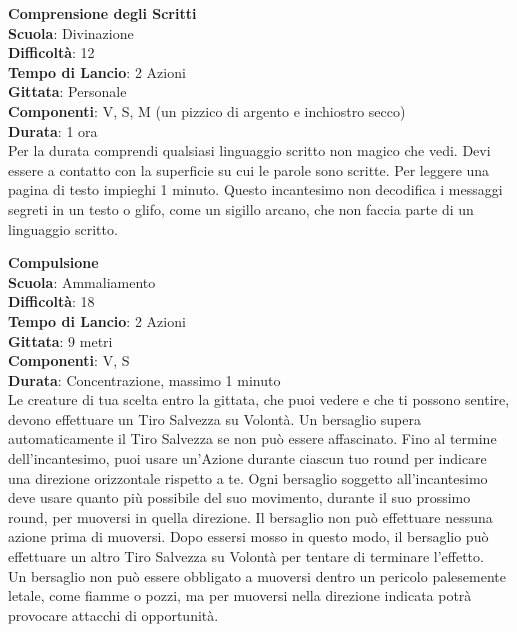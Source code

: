 \begin{multicols}{2}
\medskip\textbf{Comprensione degli Scritti}\\
\textbf{Scuola}: Divinazione\\
\textbf{Difficoltà}: 12\\
\textbf{Tempo di Lancio}: 2 Azioni\\
\textbf{Gittata}: Personale\\
\textbf{Componenti}: V, S, M (un pizzico di argento e inchiostro secco)\\
\textbf{Durata}: 1 ora\\
Per la durata comprendi qualsiasi linguaggio scritto non magico che vedi. Devi essere a contatto con la superficie su cui le parole sono scritte. Per leggere una pagina di testo impieghi 1 minuto. Questo incantesimo non decodifica i messaggi segreti in un testo o glifo, come un sigillo arcano, che non faccia parte di un linguaggio scritto.

\medskip\textbf{Compulsione}\\
\textbf{Scuola}: Ammaliamento\\
\textbf{Difficoltà}: 18\\
\textbf{Tempo di Lancio}: 2 Azioni\\
\textbf{Gittata}: 9 metri\\
\textbf{Componenti}: V, S\\
\textbf{Durata}: Concentrazione, massimo 1 minuto\\
Le creature di tua scelta entro la gittata, che puoi vedere e che ti possono sentire, devono effettuare un Tiro Salvezza su Volontà. Un bersaglio supera automaticamente il Tiro Salvezza se non può essere affascinato. Fino al termine dell'incantesimo, puoi usare un'Azione durante ciascun tuo round per indicare una direzione orizzontale rispetto a te. Ogni bersaglio soggetto all'incantesimo deve usare quanto più possibile del suo movimento, durante il suo prossimo round, per muoversi in quella direzione. Il bersaglio non può effettuare nessuna azione prima di muoversi. Dopo essersi mosso in questo modo, il bersaglio può effettuare un altro Tiro Salvezza su Volontà per tentare di terminare l'effetto.\\
Un bersaglio non può essere obbligato a muoversi dentro un pericolo palesemente letale, come fiamme o pozzi, ma per muoversi nella direzione indicata potrà provocare attacchi di opportunità.


\end{multicols}
